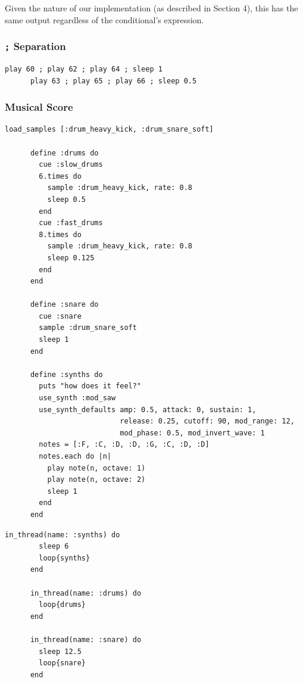 \documentclass[11pt, abstracton, twoside]{scrartcl}
\begin{document}
Given the nature of our implementation (as described in Section 4), this has the
same output regardless of the conditional's expression.

\subsubsection{\texttt{;} Separation}
\begin{minipage}{\textwidth}
	\begin{lstlisting}[style = sonicpi]
      play 60 ; play 62 ; play 64 ; sleep 1
      play 63 ; play 65 ; play 66 ; sleep 0.5
	\end{lstlisting}
\end{minipage}

\subsubsection{Musical Score}
\begin{minipage}{\textwidth}
	\begin{lstlisting}[style = sonicpi]
      load_samples [:drum_heavy_kick, :drum_snare_soft]

      define :drums do
        cue :slow_drums
        6.times do
          sample :drum_heavy_kick, rate: 0.8
          sleep 0.5
        end
        cue :fast_drums
        8.times do
          sample :drum_heavy_kick, rate: 0.8
          sleep 0.125
        end
      end
      
      define :snare do
        cue :snare
        sample :drum_snare_soft
        sleep 1
      end
      
      define :synths do
        puts "how does it feel?"
        use_synth :mod_saw
        use_synth_defaults amp: 0.5, attack: 0, sustain: 1, 
                           release: 0.25, cutoff: 90, mod_range: 12, 
                           mod_phase: 0.5, mod_invert_wave: 1
        notes = [:F, :C, :D, :D, :G, :C, :D, :D]
        notes.each do |n|
          play note(n, octave: 1)
          play note(n, octave: 2)
          sleep 1
        end
      end
    \end{lstlisting}
\end{minipage}

\begin{minipage}{\textwidth}
	\begin{lstlisting}[style = sonicpi]
      in_thread(name: :synths) do
        sleep 6
        loop{synths}
      end
      
      in_thread(name: :drums) do
        loop{drums}
      end
      
      in_thread(name: :snare) do
        sleep 12.5
        loop{snare}
      end
	\end{lstlisting}
\end{minipage}
\end{document}
